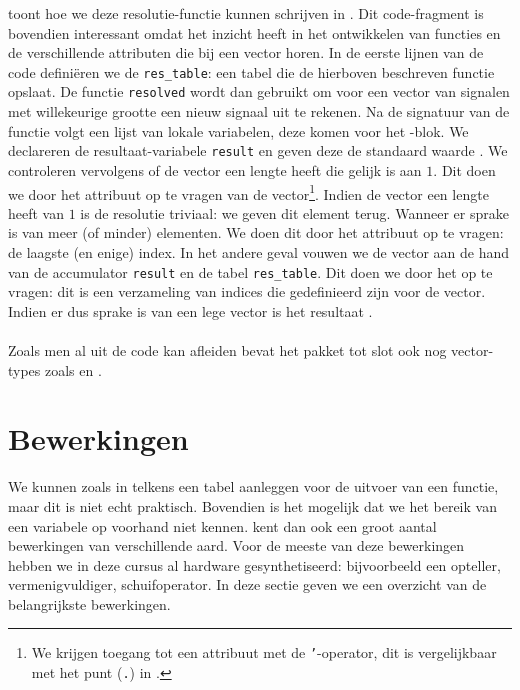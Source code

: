  toont hoe we deze resolutie-functie kunnen schrijven in \tvhdl{}. Dit code-fragment is bovendien interessant omdat het inzicht heeft in het ontwikkelen van functies en de verschillende attributen die bij een vector horen. In de eerste lijnen van de code defini\"eren we de \texttt{res\_table}: een tabel die de hierboven beschreven functie opslaat. De functie \texttt{resolved} wordt dan gebruikt om voor een vector van signalen met willekeurige grootte een nieuw signaal uit te rekenen. Na de signatuur van de functie volgt een lijst van lokale variabelen, deze komen voor het -blok. We declareren de resultaat-variabele \texttt{result} en geven deze de standaard waarde . We controleren vervolgens of de vector een lengte heeft die gelijk is aan $1$. Dit doen we door het  attribuut op te vragen van de vector\footnote{We krijgen toegang tot een attribuut met de \texttt{'}-operator, dit is vergelijkbaar met het punt (\texttt{.}) in \tjava{}.}. Indien de vector een lengte heeft van $1$ is de resolutie triviaal: we geven dit element terug. Wanneer er sprake is van meer (of minder) elementen. We doen dit door het  attribuut op te vragen: de laagste (en enige) index. In het andere geval vouwen we de vector aan de hand van de accumulator \texttt{result} en de tabel \texttt{res\_table}. Dit doen we door het  op te vragen: dit is een verzameling van indices die gedefinieerd zijn voor de vector. Indien er dus sprake is van een lege vector is het resultaat .

\paragraph{}
Zoals men al uit de code kan afleiden bevat het pakket tot slot ook nog vector-types zoals  en .

\section{Bewerkingen}
We kunnen zoals in  telkens een tabel aanleggen voor de uitvoer van een functie, maar dit is niet echt praktisch. Bovendien is het mogelijk dat we het bereik van een variabele op voorhand niet kennen. \tvhdl{} kent dan ook een groot aantal bewerkingen van verschillende aard. Voor de meeste van deze bewerkingen hebben we in deze cursus al hardware gesynthetiseerd: bijvoorbeeld een opteller, vermenigvuldiger, schuifoperator. In deze sectie geven we een overzicht van de belangrijkste bewerkingen.


